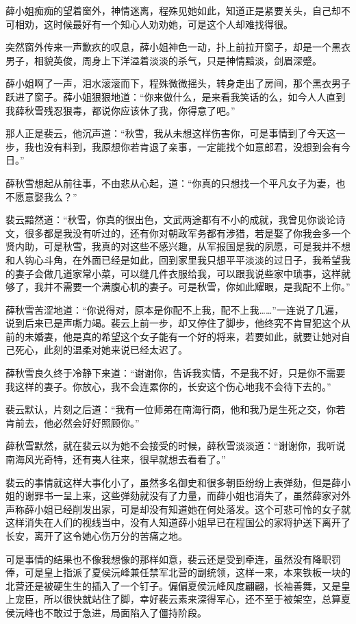 薛小姐痴痴的望着窗外，神情迷离，程殊见她如此，知道正是紧要关头，自己却不可相劝，这时候最好有一个知心人劝劝她，可是这个人却难找得很。

突然窗外传来一声歉疚的叹息，薛小姐神色一动，扑上前拉开窗子，却是一个黑衣男子，相貌英俊，周身上下洋溢着淡淡的杀气，只是神情黯淡，剑眉深蹙。

薛小姐啊了一声，泪水滚滚而下，程殊微微摇头，转身走出了房间，那个黑衣男子跃进了窗子。薛小姐狠狠地道：“你来做什么，是来看我笑话的么，如今人人直到我薛秋雪残忍狠毒，都说你应该休了我，你得意了吧。”

那人正是裴云，他沉声道：“秋雪，我从未想这样伤害你，可是事情到了今天这一步，我也没有料到，我原想你若肯退了亲事，一定能找个如意郎君，没想到会有今日。”

薛秋雪想起从前往事，不由悲从心起，道：“你真的只想找一个平凡女子为妻，也不愿意娶我么？”

裴云黯然道：“秋雪，你真的很出色，文武两途都有不小的成就，我曾见你谈论诗文，很多都是我没有听过的，还有你对朝政军务都有涉猎，若是娶了你我会多一个贤内助，可是秋雪，我真的对这些不感兴趣，从军报国是我的夙愿，可是我并不想和人钩心斗角，在外面已经是如此，回到家里我只想平平淡淡的过日子，我希望我的妻子会做几道家常小菜，可以缝几件衣服给我，可以跟我说些家中琐事，这样就够了，我并不需要一个满腹心机的妻子。可是秋雪，你如此耀眼，是我配不上你。”

薛秋雪苦涩地道：“你说得对，原本是你配不上我，配不上我……”一连说了几遍，说到后来已是声嘶力竭。裴云上前一步，却又停住了脚步，他终究不肯冒犯这个从前的未婚妻，他是真的希望这个女子能有一个好的将来，若要如此，就要让她对自己死心，此刻的温柔对她来说已经太迟了。

薛秋雪良久终于冷静下来道：“谢谢你，告诉我实情，不是我不好，只是你不需要我这样的妻子。你放心，我不会连累你的，长安这个伤心地我不会待下去的。”

裴云默认，片刻之后道：“我有一位师弟在南海行商，他和我乃是生死之交，你若肯前去，他必然会好好照顾你。”

薛秋雪默然，就在裴云以为她不会接受的时候，薛秋雪淡淡道：“谢谢你，我听说南海风光奇特，还有夷人往来，很早就想去看看了。”

裴云的事情就这样大事化小了，虽然多名御史和很多朝臣纷纷上表弹劾，但是薛小姐的谢罪书一呈上来，这些弹劾就没有了力量，而薛小姐也消失了，虽然薛家对外声称薛小姐已经削发出家，可是却没有知道她在何处落发。这个可悲可怜的女子就这样消失在人们的视线当中，没有人知道薛小姐早已在程国公的家将护送下离开了长安，离开了这令她心伤万分的苦痛之地。

可是事情的结果也不像我想像的那样如意，裴云还是受到牵连，虽然没有降职罚俸，可是皇上指派了夏侯沅峰兼任禁军北营的副统领，这样一来，本来铁板一块的北营还是被硬生生的插入了一个钉子。偏偏夏侯沅峰风度翩翩，长袖善舞，又是皇上宠臣，所以很快就站住了脚，幸好裴云素来深得军心，还不至于被架空，总算夏侯沅峰也不敢过于急进，局面陷入了僵持阶段。

